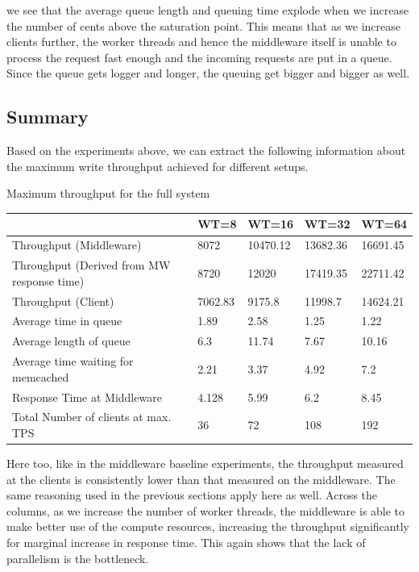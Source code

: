 \documentclass[11pt,a4paper]{article}
\newcommand\instructions[1]{\textcolor{blue}{Instructions: #1}}
\begin{document}
we see that the average queue length and queuing time explode when we increase the number of cents above the saturation point. This means that as we increase clients further, the worker threads and hence the middleware itself is unable to process the request fast enough and the incoming requests are put in a queue. Since the queue gets logger and longer, the queuing get bigger and bigger as well.



\subsection{Summary}

Based on the experiments above, we can extract the following information about the maximum write throughput achieved for different setups.

\begin{center}
	{Maximum throughput for the full system}
	\begin{tabular}{|l|p{1.5cm}|p{1.5cm}|p{1.5cm}|p{1.5cm}|}
		\hline                                            & WT=8    & WT=16    & WT=32    & WT=64    \\ 
		\hline Throughput (Middleware)                    & 8072    & 10470.12 & 13682.36 & 16691.45 \\ 
		\hline Throughput (Derived from MW response time) & 8720    & 12020    & 17419.35  & 22711.42 \\ 
		\hline Throughput (Client)                        & 7062.83 & 9175.8   & 11998.7  & 14624.21 \\ 
		\hline Average time in queue                      & 1.89    & 2.58     & 1.25     & 1.22     \\ 
		\hline Average length of queue                    & 6.3     & 11.74    & 7.67     & 10.16    \\ 
		\hline Average time waiting for memcached         & 2.21    & 3.37     & 4.92     & 7.2      \\ 
		\hline Response Time at Middleware                 & 4.128   & 5.99     & 6.2      & 8.45     \\
		\hline Total Number of clients at max. TPS        & 36      & 72       & 108      & 192      \\
		\hline 
	\end{tabular}
\end{center}

Here too, like in the middleware baseline experiments, the throughput measured at the clients is consistently lower than that measured on the middleware. The same reasoning used in the previous sections apply here as well. Across the columns, as we increase the number of worker threads, the middleware is able to make better use of the compute resources, increasing the throughput significantly for marginal increase in response time. This again shows that the lack of parallelism is the bottleneck.
\end{document}
